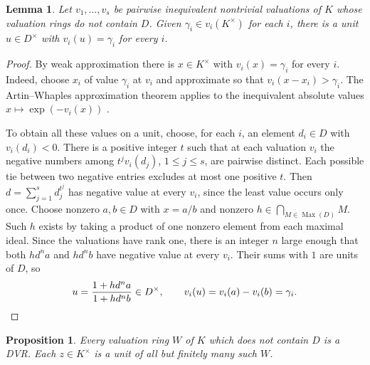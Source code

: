 \documentclass[11pt, letterpaper]{article}
\newtheorem{lemma}[theorem]{Lemma}
\newtheorem{proposition}[theorem]{Proposition}
\theoremstyle{definition}
\theoremstyle{remark}
\begin{document}
\begin{lemma}
    \label{lem:simultaneous-units}
    Let $v_1, \dots, v_s$ be pairwise inequivalent nontrivial valuations of $K$ whose valuation rings do not contain $D$.
    Given $\gamma_i \in v_i(K^{\times})$ for each $i$, there is a unit $u \in D^{\times}$ with $v_i(u) = \gamma_i$ for every $i$.
\end{lemma}

\begin{proof}
    By weak approximation there is $x \in K^{\times}$ with $v_i(x) = \gamma_i$ for every $i$.
    Indeed, choose $x_i$ of value $\gamma_i$ at $v_i$ and approximate so that $v_i(x - x_i) > \gamma_i$.
    The Artin--Whaples approximation theorem applies to the inequivalent absolute values $x \mapsto \exp(-v_i(x))$ \cite[Theorem~1.1.3]{MR2183496}.

    To obtain all these values on a unit, choose, for each $i$, an element $d_i \in D$ with $v_i(d_i) < 0$.
    There is a positive integer $t$ such that at each valuation $v_i$ the negative numbers among $t^j v_i(d_j)$, $1 \le j \le s$, are pairwise distinct.
    Each possible tie between two negative entries excludes at most one positive $t$.
    Then $d = \sum_{j = 1}^{s}d_j^{t^j}$ has negative value at every $v_i$, since the least value occurs only once.
    Choose nonzero $a, b \in D$ with $x = a/b$ and nonzero $h \in \bigcap_{M \in \operatorname{Max}(D)}M$.
    Such $h$ exists by taking a product of one nonzero element from each maximal ideal.
    Since the valuations have rank one, there is an integer $n$ large enough that both $hd^n a$ and $hd^n b$ have negative value at every $v_i$.
    Their sums with $1$ are units of $D$, so
    \[
        u = \frac{1 + hd^n a}{1 + hd^n b} \in D^{\times},
        \qquad v_i(u) = v_i(a) - v_i(b) = \gamma_i. \qedhere
    \]
\end{proof}

\begin{proposition}
    \label{prop:outside}
    Every valuation ring $W$ of $K$ which does not contain $D$ is a DVR.
    Each $z \in K^{\times}$ is a unit of all but finitely many such $W$.
\end{proposition}
\end{document}
